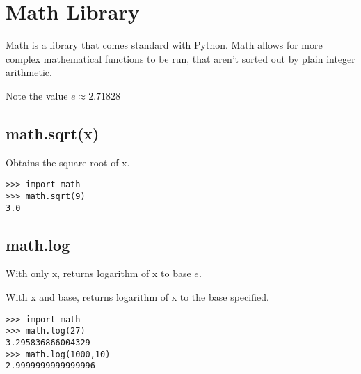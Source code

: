 \chapter{Math Library}


Math is a library that comes standard with Python. Math allows for
more complex mathematical functions to be run, that aren't sorted
out by plain integer arithmetic.

Note the value $\mathit{e}\approx2.71828$


\section{math.sqrt(x)}

Obtains the square root of x.

\begin{verbatim}
>>> import math 
>>> math.sqrt(9) 
3.0
\end{verbatim}



\section{math.log}

With only x, returns logarithm of x to base $\mathit{e}$.

With x and base, returns logarithm of x to the base specified.

\begin{verbatim}
>>> import math 
>>> math.log(27) 
3.295836866004329 
>>> math.log(1000,10) 
2.9999999999999996
\end{verbatim}


